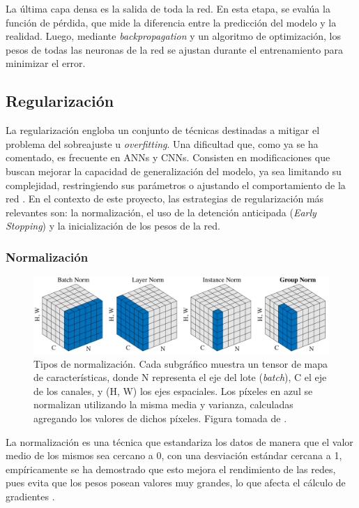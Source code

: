 La última capa densa es la salida de toda la red. En esta etapa, se evalúa la función de pérdida, que mide la diferencia entre la predicción del modelo y la realidad. Luego, mediante \textit{backpropagation} y un algoritmo de optimización, los pesos de todas las neuronas de la red se ajustan durante el entrenamiento para minimizar el error.

\subsection{Regularización}
\label{subsection:regularization}
La regularización engloba un conjunto de técnicas destinadas a mitigar el problema del sobreajuste u \textit{overfitting}. Una dificultad que, como ya se ha comentado, es frecuente en ANNs y CNNs. Consisten en modificaciones que buscan mejorar la capacidad de generalización del modelo, ya sea limitando su complejidad, restringiendo sus parámetros o ajustando el comportamiento de la red \cite{Goodfellow-et-al-2016}. En el contexto de este proyecto, las estrategias de regularización más relevantes son: la normalización, el uso de la detención anticipada (\textit{Early Stopping}) y la inicialización de los pesos de la red.

\subsubsection{Normalización}

\begin{figure}[h]
    \centering
    \includegraphics[width=\linewidth]{figures/2_theory/normTypes.pdf}
    \caption[Tipos de normalización]{Tipos de normalización. Cada subgráfico muestra un tensor de mapa de características, donde N representa el eje del lote (\textit{batch}), C el eje de los canales, y (H, W) los ejes espaciales. Los píxeles en azul se normalizan utilizando la misma media y varianza, calculadas agregando los valores de dichos píxeles. Figura tomada de \cite{wu2018group}.}
    \label{fig:normTypes}
\end{figure}


La normalización es una técnica que estandariza los datos de manera que el valor medio de los mismos sea cercano a 0, con una desviación estándar cercana a 1, empíricamente se ha demostrado que esto mejora el rendimiento de las redes, pues evita que los pesos posean valores muy grandes, lo que afecta el cálculo de gradientes \cite{ioffe_batch_2015}. 

